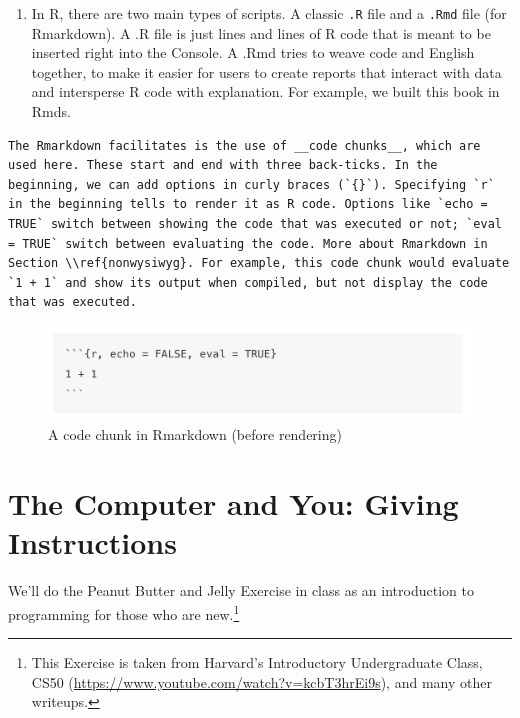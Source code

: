 \documentclass[]{book}
\providecommand{\tightlist}{%
  \setlength{\itemsep}{0pt}\setlength{\parskip}{0pt}}
\let\rmarkdownfootnote\footnote%
\def\footnote{\protect\rmarkdownfootnote}
\theoremstyle{definition}
\theoremstyle{definition}
\theoremstyle{definition}
\theoremstyle{remark}
\begin{document}
\begin{enumerate}
\def\labelenumi{\arabic{enumi}.}
\setcounter{enumi}{4}
\tightlist
\item
  In R, there are two main types of scripts. A classic \texttt{.R} file and a \texttt{.Rmd} file (for Rmarkdown). A .R file is just lines and lines of R code that is meant to be inserted right into the Console. A .Rmd tries to weave code and English together, to make it easier for users to create reports that interact with data and intersperse R code with explanation. For example, we built this book in Rmds.
\end{enumerate}

\begin{verbatim}
The Rmarkdown facilitates is the use of __code chunks__, which are used here. These start and end with three back-ticks. In the beginning, we can add options in curly braces (`{}`). Specifying `r` in the beginning tells to render it as R code. Options like `echo = TRUE` switch between showing the code that was executed or not; `eval = TRUE` switch between evaluating the code. More about Rmarkdown in Section \\ref{nonwysiwyg}. For example, this code chunk would evaluate `1 + 1` and show its output when compiled, but not display the code that was executed.
\end{verbatim}

\begin{figure}
\centering
\includegraphics{images/11_4_codechunk.png}
\caption{A code chunk in Rmarkdown (before rendering)}
\end{figure}

\hypertarget{the-computer-and-you-giving-instructions}{%
\section{The Computer and You: Giving Instructions}\label{the-computer-and-you-giving-instructions}}

We'll do the Peanut Butter and Jelly Exercise in class as an introduction to programming for those who are new.\footnote{This Exercise is taken from Harvard's Introductory Undergraduate Class, CS50 (\url{https://www.youtube.com/watch?v=kcbT3hrEi9s}), and many other writeups.}
\end{document}

